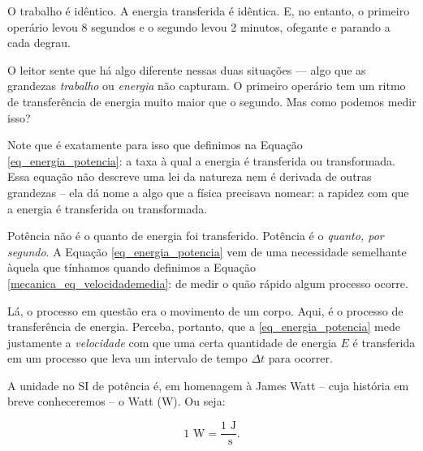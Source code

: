O trabalho é idêntico. A energia transferida é idêntica. E, no entanto, o primeiro operário levou 8 segundos e o segundo levou 2 minutos, ofegante e parando a cada degrau.

O leitor sente que há algo diferente nessas duas situações — algo que as grandezas \textit{trabalho} ou \textit{energia} não capturam. O primeiro operário tem um ritmo de transferência de energia muito maior que o segundo. Mas como podemos medir isso?

Note que é exatamente para isso que definimos na Equação \eqref{eq_energia_potencia}: a taxa à qual a energia é transferida ou transformada. Essa equação não descreve uma lei da natureza nem é derivada de outras grandezas -- ela dá nome a algo que a física precisava nomear: a rapidez com que a energia é transferida ou transformada. 

Potência não é o quanto de energia foi transferido. Potência é o \textit{quanto, por segundo}. A Equação \eqref{eq_energia_potencia} vem de uma necessidade semelhante àquela que tínhamos quando definimos a Equação \eqref{mecanica_eq_velocidademedia}: de medir o quão rápido algum processo ocorre.

Lá, o processo em questão era o movimento de um corpo. Aqui, é o processo de transferência de energia. Perceba, portanto, que a \eqref{eq_energia_potencia} mede justamente a \emph{velocidade} com que uma certa quantidade de energia $E$ é transferida em um processo que leva um intervalo de tempo $\Delta t$ para ocorrer.

A unidade no SI de potência é, em homenagem à James Watt -- cuja história em breve conheceremos -- o Watt (W). Ou seja:

$$ 1 \text{ W} =  \dfrac{1 \text{ J}}{\text{ s}}.$$




